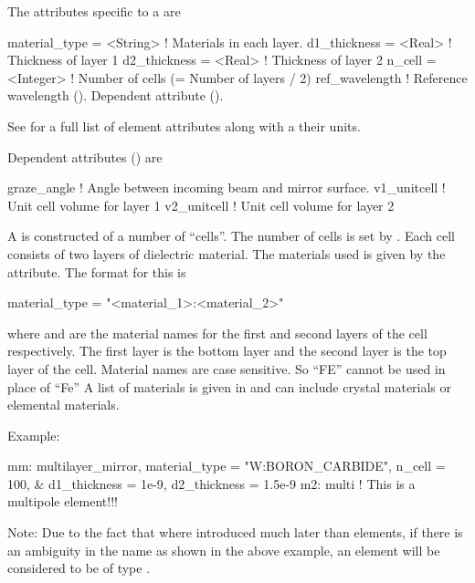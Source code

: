 {
The attributes specific to a  are 
\begin{example}
  material_type    = <String>  ! Materials in each layer.
  d1_thickness     = <Real>    ! Thickness of layer 1
  d2_thickness     = <Real>    ! Thickness of layer 2
  n_cell           = <Integer> ! Number of cells (= Number of layers / 2)
  ref_wavelength               ! Reference wavelength (). Dependent attribute ().
\end{example}
See  for a full list of element attributes along with a their units.

Dependent attributes () are
\begin{example}
  graze_angle      ! Angle between incoming beam and mirror surface.
  v1_unitcell      ! Unit cell volume for layer 1
  v2_unitcell      ! Unit cell volume for layer 2 
\end{example}

A  is constructed of a number of ``cells''. The
number of cells is set by . Each cell consists of two
layers of dielectric material. The materials used is given by
the  attribute. The format for this is
\begin{example}
  material_type = "<material_1>:<material_2>"
\end{example}
where  and  are the material names
for the first and second layers of the cell respectively. The first
layer is the bottom layer and the second layer is the top layer of the
cell.  Material names are case sensitive. So ``FE'' cannot be used in
place of ``Fe'' A list of materials is given in 
and can include crystal materials or elemental materials.

Example:
\begin{example}
  mm: multilayer_mirror, material_type = "W:BORON_CARBIDE", n_cell = 100, &
            d1_thickness = 1e-9, d2_thickness = 1.5e-9
  m2: multi    ! This is a multipole element!!!
\end{example}
Note: Due to the fact that  where introduced much later than 
elements, if there is an ambiguity in the name as shown in the above example, an element will be
considered to be of type .

\newpage

}
